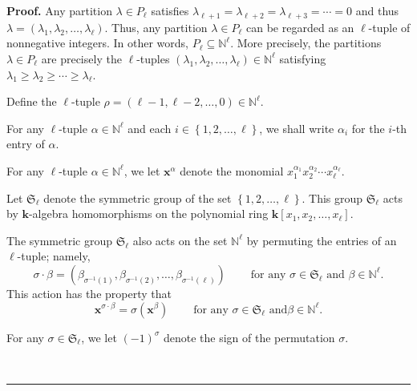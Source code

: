 \documentclass[numbers=enddot,12pt,final,onecolumn,notitlepage]{scrartcl}%
\theoremstyle{definition}
\newenvironment{proof}[1][Proof]{\noindent\textbf{#1.} }{\ \rule{0.5em}{0.5em}}
\newenvironment{verlong}{}{}
\begin{document}
\begin{verlong}
\begin{proof}
Any partition $\lambda\in P_{\ell}$ satisfies $\lambda_{\ell+1}=\lambda
_{\ell+2}=\lambda_{\ell+3}=\cdots=0$ and thus $\lambda=\left(  \lambda
_{1},\lambda_{2},\ldots,\lambda_{\ell}\right)  $. Thus, any partition
$\lambda\in P_{\ell}$ can be regarded as an $\ell$-tuple of nonnegative
integers. In other words, $P_{\ell}\subseteq\mathbb{N}^{\ell}$. More
precisely, the partitions $\lambda\in P_{\ell}$ are precisely the $\ell
$-tuples $\left(  \lambda_{1},\lambda_{2},\ldots,\lambda_{\ell}\right)
\in\mathbb{N}^{\ell}$ satisfying $\lambda_{1}\geq\lambda_{2}\geq\cdots
\geq\lambda_{\ell}$.

Define the $\ell$-tuple $\rho=\left(  \ell-1,\ell-2,\ldots,0\right)
\in\mathbb{N}^{\ell}$.

For any $\ell$-tuple $\alpha\in\mathbb{N}^{\ell}$ and each $i\in\left\{
1,2,\ldots,\ell\right\}  $, we shall write $\alpha_{i}$ for the $i$-th entry
of $\alpha$.

For any $\ell$-tuple $\alpha\in\mathbb{N}^{\ell}$, we let $\mathbf{x}^{\alpha
}$ denote the monomial $x_{1}^{\alpha_{1}}x_{2}^{\alpha_{2}}\cdots x_{\ell
}^{\alpha_{\ell}}$.

Let $\mathfrak{S}_{\ell}$ denote the symmetric group of the set $\left\{
1,2,\ldots,\ell\right\}  $. This group $\mathfrak{S}_{\ell}$ acts by
$\mathbf{k}$-algebra homomorphisms on the polynomial ring $\mathbf{k}\left[
x_{1},x_{2},\ldots,x_{\ell}\right]  $.

The symmetric group $\mathfrak{S}_{\ell}$ also acts on the set $\mathbb{N}%
^{\ell}$ by permuting the entries of an $\ell$-tuple; namely,%
\[
\sigma\cdot\beta=\left(  \beta_{\sigma^{-1}\left(  1\right)  },\beta
_{\sigma^{-1}\left(  2\right)  },\ldots,\beta_{\sigma^{-1}\left(  \ell\right)
}\right)  \ \ \ \ \ \ \ \ \ \ \text{for any }\sigma\in\mathfrak{S}_{\ell
}\text{ and }\beta\in\mathbb{N}^{\ell}.
\]
This action has the property that%
\[
\mathbf{x}^{\sigma\cdot\beta}=\sigma\left(  \mathbf{x}^{\beta}\right)
\ \ \ \ \ \ \ \ \ \ \text{for any }\sigma\in\mathfrak{S}_{\ell}\text{ and
}\beta\in\mathbb{N}^{\ell}.
\]


For any $\sigma\in\mathfrak{S}_{\ell}$, we let $\left(  -1\right)  ^{\sigma}$
denote the sign of the permutation $\sigma$.


\end{proof}
\end{verlong}
\end{document}
